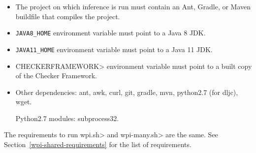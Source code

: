 \begin{itemize}
\item The project on which inference is run must contain an Ant, Gradle,
  or Maven buildfile that compiles the project.
\item \verb|JAVA8_HOME| environment variable must point to a Java 8 JDK.
\item \verb|JAVA11_HOME| environment variable must point to a Java 11 JDK.
\item \<CHECKERFRAMEWORK> environment variable must point to a built copy of the Checker Framework.
\item Other dependencies:
  ant,
  awk,
  curl,
  git,
  gradle,
  mvn,
  python2.7 (for dljc),
  wget.

  Python2.7 modules:
  subprocess32.
\end{itemize}




The requirements to run \<wpi.sh> and \<wpi-many.sh> are the same. See Section~\ref{wpi-shared-requirements}
for the list of requirements.

